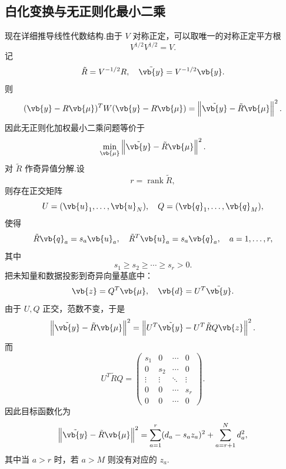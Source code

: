 \subsection{白化变换与无正则化最小二乘}

现在详细推导线性代数结构.由于 \(V\) 对称正定，可以取唯一的对称正定平方根
\begin{equation*}
	V^{1/2}V^{1/2}=V.
\end{equation*}
记
\begin{equation*}
	\tilde{R}=V^{-1/2}R,\quad
	\tilde{\vb{y}}=V^{-1/2}\vb{y}.
\end{equation*}
则
\begin{equation*}
	(\vb{y}-R\vb{\mu})^TW(\vb{y}-R\vb{\mu})
	=\left\|\tilde{\vb{y}}-\tilde{R}\vb{\mu}\right\|^2.
\end{equation*}
因此无正则化加权最小二乘问题等价于
\begin{equation*}
	\min_{\vb{\mu}}\left\|\tilde{\vb{y}}-\tilde{R}\vb{\mu}\right\|^2.
\end{equation*}
对 \(\tilde{R}\) 作奇异值分解.设
\begin{equation*}
	r=\operatorname{rank}\tilde{R},
\end{equation*}
则存在正交矩阵
\begin{equation*}
	U=(\vb{u}_1,\ldots,\vb{u}_N),\quad
	Q=(\vb{q}_1,\ldots,\vb{q}_M),
\end{equation*}
使得
\begin{equation*}
	\tilde{R}\vb{q}_a=s_a\vb{u}_a,\quad
	\tilde{R}^T\vb{u}_a=s_a\vb{q}_a,\quad
	a=1,\ldots,r,
\end{equation*}
其中
\begin{equation*}
	s_1\geq s_2\geq\cdots\geq s_r>0.
\end{equation*}
把未知量和数据投影到奇异向量基底中：
\begin{equation*}
	\vb{z}=Q^T\vb{\mu},\quad
	\vb{d}=U^T\tilde{\vb{y}}.
\end{equation*}
由于 \(U,Q\) 正交，范数不变，于是
\begin{equation*}
	\left\|\tilde{\vb{y}}-\tilde{R}\vb{\mu}\right\|^2
	=\left\|U^T\tilde{\vb{y}}-U^T\tilde{R}Q\vb{z}\right\|^2.
\end{equation*}
而
\begin{equation*}
	U^T\tilde{R}Q
	=
	\begin{pmatrix}
		s_1 & 0 & \cdots & 0\\
		0 & s_2 & \cdots & 0\\
		\vdots & \vdots & \ddots & \vdots\\
		0 & 0 & \cdots & s_r\\
		0 & 0 & \cdots & 0
	\end{pmatrix}.
\end{equation*}
因此目标函数化为
\begin{equation*}
	\left\|\tilde{\vb{y}}-\tilde{R}\vb{\mu}\right\|^2
	=\sum_{a=1}^{r}(d_a-s_az_a)^2
	+\sum_{a=r+1}^{N}d_a^2,
\end{equation*}
其中当 \(a>r\) 时，若 \(a>M\) 则没有对应的 \(z_a\).

